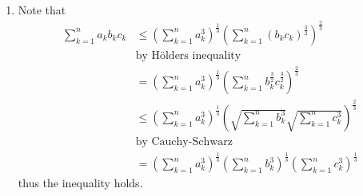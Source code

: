 \documentclass[12pt, letterpaper]{article}
\begin{document}
\begin{enumerate}
	\item Note that 
	\begin{align*}
	\sum_{k=1}^n a_k b_k c_k &\leq \left(\sum_{k=1}^n a_k^3 \right)^{\frac{1}{3}}\left( \sum_{k=1}^n (b_k c_k)^{\frac{3}{2}} \right)^{\frac{2}{3}}\\
	& \text{by H{\"o}lders inequality}\\
	&= \left(\sum_{k=1}^n a_k^3 \right)^{\frac{1}{3}}\left( \sum_{k=1}^n b_k^{\frac{3}{2}} c_k^{\frac{3}{2}} \right)^{\frac{2}{3}}\\
	&\leq \left(\sum_{k=1}^n a_k^3 \right)^{\frac{1}{3}} \left(\sqrt{ \sum_{k=1}^n b_k^3 } \sqrt{\sum_{k=1}^n c_k^3 }\right)^{\frac{2}{3}}\\
	& \text{by Cauchy-Schwarz}\\
	&= \left(\sum_{k=1}^n a_k^3 \right)^{\frac{1}{3}}\left(\sum_{k=1}^n b_k^3 \right)^{\frac{1}{3}}\left(\sum_{k=1}^n c_k^3 \right)^{\frac{1}{3}}
	\end{align*}
	thus the inequality holds.  
\end{enumerate}
\end{document}
